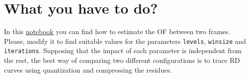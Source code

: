 \begin{comment}
The OF~\cite{horn1981determining} tries to establish connections between the pixels of
the frames $P$ and $R$ supposing that:
\begin{enumerate}
\item $P$ and $R$ are adjacent in time (if $R$ was taken at time $t$,
  $P$ is taken at time $dt+t$) and therefore, similar in
  content.
\item Similarity between images implies that the pixels in both
  frames, $R$ and $P$, will have the same luminance. If $I(x,y,t)$
  measures the luminance of the pixel $(x,y)$ of the frame $R$,
  similarity can be modeled by
  \begin{equation}
    I(x+dx, y+dy, t+dt) = I(x,y,t),
    \label{eq:similarity}
  \end{equation}
  where $I(x+dx, y+dy, t+dt)$ is the corresponding pixel in the frame
  $P$. The first part of the Eq.~\ref{eq:similarity} can be also
  computed by (using the first-order Taylor expansion) as
  \begin{equation}
    I(x+dx, y+dy, t+dt) = I(x,y,t) + \frac{\partial I}{\partial x}dx + \frac{\partial I}{\partial y}dy + \frac{\partial I}{\partial t}dt,
    \label{eq:taylor_exp}
  \end{equation}
  andtherefore, it must be true that
  \begin{equation}
    \frac{\partial I}{\partial x}dx + \frac{\partial I}{\partial y}dy + \frac{\partial I}{\partial t}dt = 0.
    \label{eq:constraint}
  \end{equation}
  Dividing by $dt$, we finally get that
  \begin{equation}
    \frac{\partial I}{\partial x}\frac{dx}{dt} + \frac{\partial I}{\partial y}\frac{dy}{dt} + \frac{\partial I}{\partial t} = 0.
  \end{equation}
\item Adjacent pixels follow parallel
  trajectories~\cite{horn1981determining}, with basically means that
  neighbor pixels will have similar motion.
\end{enumerate}
\end{comment}

\section{What you have to do?}

In this
\href{https://github.com/Sistemas-Multimedia/Sistemas-Multimedia.github.io/blob/master/milestones/10-ME/optical_flow.ipynb}{notebook}
you can find how to estimate the OF between two frames. Please, modify
it to find suitable values for the parameters \texttt{levels},
\texttt{winsize} and \texttt{iterations}. Supposing that the impact of
each parameter is independent from the rest, the best way of comparing
two different configurations is to trace RD curves using quantization
and compressing the residues.

